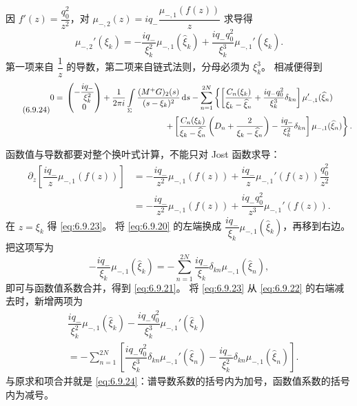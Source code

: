 \documentclass[lang=cn,scheme=chinese,mode=simple,device=normal,color=blue,
math=cm,thmcnt=section,12pt]{elegantbook}
\newcommand{\dd}{\,\mathrm{d}}
\newcommand{\eqq}[2]{\tag{#1}\label{eq:#1}#2}
\begin{document}
因 $f'(z)=\dfrac{q_0^2}{z^2}$，对 $\mu_{-,2}(z)=iq_-\dfrac{\mu_{-,1}(f(z))}{z}$ 求导得
\begin{equation}\eqq{6.9.23}{\mu_{-,2}'(\xi_k)=-\dfrac{iq_-}{\xi_k^2}\mu_{-,1}(\widehat\xi_k)+
        \dfrac{iq_-q_0^2}{\xi_k^3}\mu_{-,1}'(\widehat\xi_k).}\end{equation}
第一项来自 $\dfrac{1}{z}$ 的导数，第二项来自链式法则，分母必须为 $\xi_k^3$。
相减便得到
\begin{equation}
    \eqq{6.9.24}{\begin{aligned}
            0={} & \begin{pmatrix}-\dfrac{iq_-}{\xi_k^2}\\0\end{pmatrix}+\dfrac{1}{2\pi i}\int\limits_\Sigma\dfrac{(M^+G)_2(s)}{(s-\xi_k)^2}\dd s
            -\sum\limits_{n=1}^{2N}\left\{
            \left[\dfrac{C_n(\xi_k)}{\xi_k-\widehat\xi_n}+\dfrac{iq_-q_0^2}{\xi_k^3}\delta_{kn}\right]\mu_{-,1}'(\widehat\xi_n)\right.            \\
                 & \hspace{42mm}\left.+
            \left[\dfrac{C_n(\xi_k)}{\xi_k-\widehat\xi_n}\left(D_n+\dfrac{2}{\xi_k-\widehat\xi_n}\right)
                -\dfrac{iq_-}{\xi_k^2}\delta_{kn}\right]\mu_{-,1}(\widehat\xi_n)\right\}.
        \end{aligned}}
\end{equation}

\begin{callout}
    函数值与导数都要对整个换叶式计算，不能只对 Jost 函数求导：
    \[
        \begin{aligned}
            \partial_z\left[\dfrac{iq_-}{z}\mu_{-,1}(f(z))\right]
             & =-\dfrac{iq_-}{z^2}\mu_{-,1}(f(z))+\dfrac{iq_-}{z}\mu_{-,1}'(f(z))\dfrac{q_0^2}{z^2} \\
             & =-\dfrac{iq_-}{z^2}\mu_{-,1}(f(z))+\dfrac{iq_-q_0^2}{z^3}\mu_{-,1}'(f(z)).
        \end{aligned}
    \]
    在 $z=\xi_k$ 得 \eqref{eq:6.9.23}。
    将 \eqref{eq:6.9.20} 的左端换成 $\dfrac{iq_-}{\xi_k}\mu_{-,1}(\widehat\xi_k)$，再移到右边。
    把这项写为
    \[
        -\dfrac{iq_-}{\xi_k}\mu_{-,1}(\widehat\xi_k)
        =-\sum\limits_{n=1}^{2N}\dfrac{iq_-}{\xi_k}\delta_{kn}\mu_{-,1}(\widehat\xi_n),
    \]
    即可与函数值系数合并，得到 \eqref{eq:6.9.21}。
    将 \eqref{eq:6.9.23} 从 \eqref{eq:6.9.22} 的右端减去时，新增两项为
    \[
        \begin{aligned}
             & \dfrac{iq_-}{\xi_k^2}\mu_{-,1}(\widehat\xi_k)-\dfrac{iq_-q_0^2}{\xi_k^3}\mu_{-,1}'(\widehat\xi_k) \\
             & =-\sum\limits_{n=1}^{2N}\left[
                \dfrac{iq_-q_0^2}{\xi_k^3}\delta_{kn}\mu_{-,1}'(\widehat\xi_n)
                -\dfrac{iq_-}{\xi_k^2}\delta_{kn}\mu_{-,1}(\widehat\xi_n)\right].
        \end{aligned}
    \]
    与原求和项合并就是 \eqref{eq:6.9.24}：谱导数系数的括号内为加号，函数值系数的括号内为减号。
\end{callout}
\end{document}
